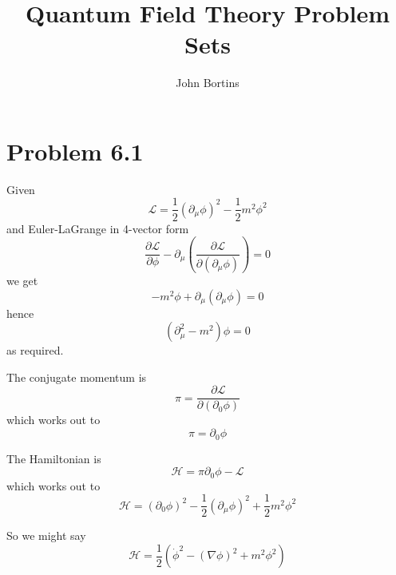 \documentclass{article}
\title{Quantum Field Theory Problem Sets}
\author{John Bortins}
\begin{document}
 
\maketitle{}
 
\section*{Problem 6.1}
 
Given \[ \mathcal{L}=\frac{1}{2}(\partial_\mu \phi)^2 - \frac{1}{2} m^2 \phi^2 \] and Euler-LaGrange in 4-vector form 
\[ \frac{\partial \mathcal{L}}{\partial \phi}-\partial_\mu  \left(\frac{\partial \mathcal{L}}{\partial (\partial_\mu \phi)}\right) = 0 \] we get \[-m^2 \phi + \partial_\mu (\partial_\mu \phi)= 0\] hence \[(\partial^2_\mu-m^2) \phi=0\] as required.

The conjugate momentum is \[\pi=\frac{\partial \mathcal{L}}{\partial (\partial_0 \phi)}\] which works out to
\[\pi=\partial_0 \phi\]

The Hamiltonian is \[\mathcal{H}=\pi \partial_0 \phi - \mathcal{L}\] which works out to
\[\mathcal{H}=(\partial_0 \phi)^2-\frac{1}{2}(\partial_\mu \phi)^2 + \frac{1}{2} m^2 \phi^2\]

So we might say \[\mathcal{H}=\frac{1}{2}(\dot{\phi}^2-(\nabla  \phi)^2 +  m^2 \phi^2)\]
\end{document}

